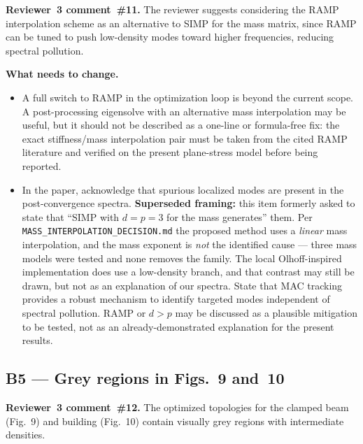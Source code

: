 \documentclass[12pt,a4paper]{article}
\begin{document}
\textbf{Reviewer~3 comment~\#11.}  The reviewer suggests considering the RAMP
interpolation scheme as an alternative to SIMP for the mass matrix, since RAMP
can be tuned to push low-density modes toward higher frequencies, reducing
spectral pollution.

\textbf{What needs to change.}
\begin{itemize}[leftmargin=1.6em]
  \item A full switch to RAMP in the optimization loop is beyond the current
        scope.  A post-processing eigensolve with an alternative mass
        interpolation may be useful, but it should not be described as a
        one-line or formula-free fix: the exact stiffness/mass interpolation
        pair must be taken from the cited RAMP literature and verified on the
        present plane-stress model before being reported.
  \item In the paper, acknowledge that spurious localized modes are present in
        the post-convergence spectra.  \textbf{Superseded framing:} this item
        formerly asked to state that ``SIMP with $d=p=3$ for the mass generates''
        them.  Per \texttt{MASS\_INTERPOLATION\_DECISION.md} the proposed method
        uses a \emph{linear} mass interpolation, and the mass exponent is
        \emph{not} the identified cause --- three mass models were tested and
        none removes the family.  The local Olhoff-inspired implementation does
        use a low-density branch, and that contrast may still be drawn, but not
        as an explanation of our spectra.  State that MAC
        tracking provides a robust mechanism to identify targeted modes
        independent of spectral pollution.  RAMP or $d>p$ may be discussed as a
        plausible mitigation to be tested, not as an already-demonstrated
        explanation for the present results.
\end{itemize}

\subsection{B5 — Grey regions in Figs.~9 and~10}

\textbf{Reviewer~3 comment~\#12.}  The optimized topologies for the clamped
beam (Fig.~9) and building (Fig.~10) contain visually grey regions with
intermediate densities.
\end{document}
